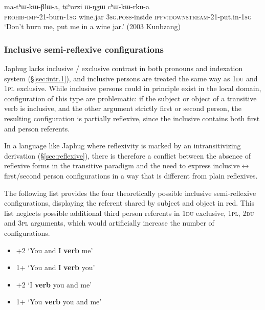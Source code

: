 \begin{exe}
\ex   \label{ex:mathWkWBlWa}
\gll ma-tʰɯ-kɯ-βlɯ-a, tɕʰorzi ɯ-ŋgɯ cʰɯ-kɯ-rku-a \\
\textsc{prohib}-\textsc{imp}-2\fl{}1-burn-\textsc{1sg} wine.jar \textsc{3sg}.\textsc{poss}-inside  \textsc{ipfv}:\textsc{downstream}-2\fl{}1-put.in-\textsc{1sg} \\
\glt `Don't burn me, put me in a wine jar.' (2003 Kunbzang)
\end{exe}

\subsubsection{Inclusive semi-reflexive configurations} \label{sec:incl.semi.reflexive}
Japhug lacks inclusive / exclusive contrast in both pronouns and indexation system (§\ref{sec:intr.1}), and inclusive persons are treated the same way as \textsc{1du} and \textsc{1pl} exclusive. While inclusive persons could in principle exist in the local domain, configuration of this type are problematic: if the subject or object of a transitive verb is inclusive, and the other argument strictly first or second person, the resulting configuration is partially reflexive, since the inclusive contains both first and person referents. 

In a language like Japhug where reflexivity is marked by an intransitivizing derivation (§\ref{sec:reflexive}), there is therefore a conflict between the absence of reflexive forms in the transitive paradigm and the need to express inclusive$\leftrightarrow$first/second person configurations in a way that is different from plain reflexives.

The following list provides the four theoretically possible inclusive semi-reflex\-ive configurations, displaying the referent shared by subject and object in red. This list neglects possible additional third person referents in \textsc{1du} exclusive, \textsc{1pl}, \textsc{2du} and \textsc{3pl} arguments, which would artificially increase the number of configurations.

\begin{itemize}
\item {}+2\fl{} `You and I \textbf{verb} me'
\item 1+\fl{} `You and I \textbf{verb} you'
\item {}\fl{}+2 `I \textbf{verb} you and me'
\item {}\fl{}1+ `You \textbf{verb} you and me'
\end{itemize}

